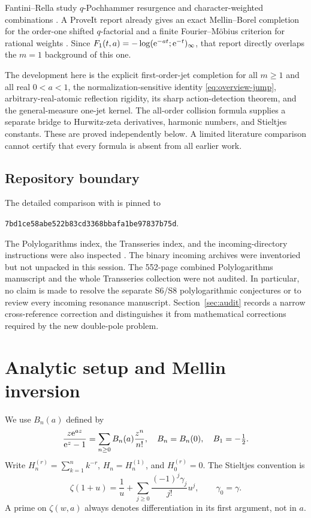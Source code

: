 \documentclass[11pt,a4paper]{article}
\numberwithin{equation}{section}
\theoremstyle{definition}\newtheorem{definition}[theorem]{Definition}
\theoremstyle{remark}\newtheorem{remark}[theorem]{Remark}
\newcommand{\pin}{\texttt{7bd1ce58abe522b83cd3368bbafa1be97837b75d}}
\begin{document}
Fantini--Rella study $q$-Pochhammer resurgence and character-weighted
combinations \cite{fr}. A ProveIt report already gives an exact
Mellin--Borel completion for the order-one shifted $q$-factorial and a
finite Fourier--M\"obius criterion for rational weights \cite{repoq}.
Since $F_1(t,a)=-\log(\mathrm e^{-at};\mathrm e^{-t})_\infty$, that report directly
overlaps the $m=1$ background of this one.

The development here is the explicit first-order-jet completion for all
$m\ge1$ and all real $0<a<1$, the normalization-sensitive identity
\eqref{eq:overview-jump}, arbitrary-real-atomic reflection rigidity, its
sharp action-detection theorem, and the general-measure one-jet kernel.
The all-order collision formula supplies a separate bridge to
Hurwitz-zeta derivatives, harmonic numbers, and Stieltjes constants.
These are proved independently below. A limited literature comparison
cannot certify that every formula is absent from all earlier work.

\subsection{Repository boundary}
The detailed comparison with \cite{repoq} is pinned to
\begin{center}\small\pin.\end{center}
The Polylogarithms index, the Transseries index, and the incoming-directory
instructions were also inspected \cite{repoindex}. The binary incoming
archives were inventoried but not unpacked in this session. The
552-page combined Polylogarithms manuscript and the whole Transseries
collection were not audited. In particular, no claim is made to resolve
the separate S6/S8 polylogarithmic conjectures or to review every
incoming resonance manuscript. Section~\ref{sec:audit} records a narrow
cross-reference correction and distinguishes it from mathematical
corrections required by the new double-pole problem.

\section{Analytic setup and Mellin inversion}
\label{sec:mellin-setup}

We use $B_n(a)$ defined by
\begin{equation}
 \frac{z\mathrm e^{az}}{\mathrm e^z-1}=\sum_{n\ge0}B_n(a)\frac{z^n}{n!},
 \quad B_n=B_n(0),\quad B_1=-\tfrac12.
 \label{eq:Bernoulli}
\end{equation}
Write $H_n^{(r)}=\sum_{k=1}^nk^{-r}$, $H_n=H_n^{(1)}$,
and $H_0^{(r)}=0$. The Stieltjes convention is
\begin{equation}
 \zeta(1+u)=\frac1u+\sum_{j\ge0}\frac{(-1)^j\gamma_j}{j!}u^j,
 \qquad\gamma_0=\gamma.
 \label{eq:Stieltjes}
\end{equation}
A prime on $\zeta(w,a)$ always denotes differentiation in its first
argument, not in $a$.
\end{document}
